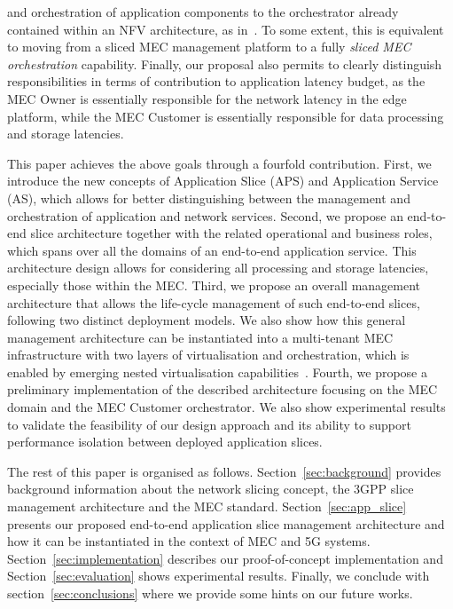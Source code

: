 and orchestration of application components to the orchestrator already contained within an NFV architecture, as in~\cite{Cominardi2020}. To some extent, this is equivalent to moving from a sliced MEC management platform to a fully \textit{sliced MEC orchestration} capability. Finally, our proposal also permits to clearly distinguish responsibilities in terms of contribution to application latency budget, as the MEC Owner is essentially responsible for the network latency in the edge platform, while the MEC Customer is essentially responsible for data processing and storage latencies.

This paper achieves the above goals through a fourfold contribution. First, we introduce the new concepts of Application Slice (APS) and Application Service (AS), which allows for better distinguishing between the management and orchestration of application and network services. Second, we propose an end-to-end slice architecture together with the related operational and business roles, which spans over all the domains of an end-to-end application service. This architecture design allows for considering all processing and storage latencies, especially those within the MEC. Third, we propose an overall management architecture that allows the life-cycle management of such end-to-end slices, following two distinct deployment models. We also show how this general management architecture can be instantiated into a multi-tenant MEC infrastructure with two layers of virtualisation and orchestration, which is enabled by emerging nested virtualisation capabilities~\cite{MEC024}. Fourth, we propose a preliminary implementation of the described architecture focusing on the MEC domain and the MEC Customer orchestrator. We also show experimental results to validate the feasibility of our design approach and its ability to support performance isolation between deployed application slices.  

The rest of this paper is organised as follows. Section~\ref{sec:background} provides background information about the network slicing concept, the 3GPP slice management architecture and the MEC standard. Section~\ref{sec:app_slice} presents our proposed end-to-end application slice management architecture and how it can be instantiated in the context of MEC and 5G systems. Section~\ref{sec:implementation} describes our proof-of-concept implementation and Section~\ref{sec:evaluation} shows experimental results. Finally, we conclude with section~\ref{sec:conclusions} where we provide some hints on our future works. 

